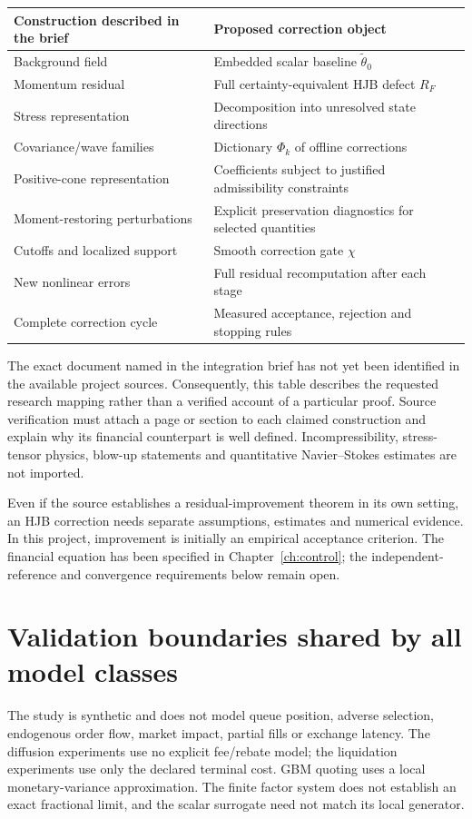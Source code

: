 \begin{center}\small
\begin{tabularx}{\textwidth}{@{}p{}X@{}}
\toprule
Construction described in the brief & Proposed correction object \\
\midrule
Background field & Embedded scalar baseline $\widetilde\theta_0$ \\
Momentum residual & Full certainty-equivalent HJB defect $R_F$ \\
Stress representation & Decomposition into unresolved state directions \\
Covariance/wave families & Dictionary $\Phi_k$ of offline corrections \\
Positive-cone representation & Coefficients subject to justified admissibility constraints \\
Moment-restoring perturbations & Explicit preservation diagnostics for selected quantities \\
Cutoffs and localized support & Smooth correction gate $\chi$ \\
New nonlinear errors & Full residual recomputation after each stage \\
Complete correction cycle & Measured acceptance, rejection and stopping rules \\
\bottomrule
\end{tabularx}\end{center}

The exact document named in the integration brief has not yet been identified in the available project sources. Consequently, this table describes the requested research mapping rather than a verified account of a particular proof. Source verification must attach a page or section to each claimed construction and explain why its financial counterpart is well defined. Incompressibility, stress-tensor physics, blow-up statements and quantitative Navier--Stokes estimates are not imported.

Even if the source establishes a residual-improvement theorem in its own setting, an HJB correction needs separate assumptions, estimates and numerical evidence. In this project, improvement is initially an empirical acceptance criterion. The financial equation has been specified in Chapter~\ref{ch:control}; the independent-reference and convergence requirements below remain open.

\section{Validation boundaries shared by all model classes}
The study is synthetic and does not model queue position, adverse selection, endogenous order flow, market impact, partial fills or exchange latency. The diffusion experiments use no explicit fee/rebate model; the liquidation experiments use only the declared terminal cost. GBM quoting uses a local monetary-variance approximation. The finite factor system does not establish an exact fractional limit, and the scalar surrogate need not match its local generator.

